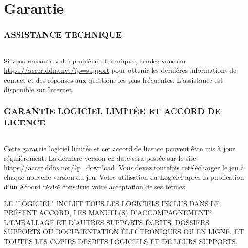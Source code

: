 \documentclass[titlepage, 13px, a4paper]{report}
\begin{document}
\AddToShipoutPicture*{\BackgroundPic}

\maketitle
\tableofcontents


\part{Garantie} 

\section*{ASSISTANCE TECHNIQUE}
\paragraph*{} \hspace{0pt}
Si vous rencontrez des problèmes techniques, rendez-vous sur 
\url{https://accer.ddns.net/?p=support} pour obtenir les dernières informations de 
contact et des réponses aux questions les plus fréquentes. L'assistance est
disponible sur Internet. \\

\section*{GARANTIE LOGICIEL LIMITÉE ET ACCORD DE LICENCE}
\paragraph*{} \hspace{0pt}
Cette garantie logiciel limitée et cet accord de licence peuvent être mis à
jour régulièrement. La dernière version en date sera postée sur le site 
\url{https://accer.ddns.net/?p=download}. Vous devez toutefois retélécharger le 
jeu à chaque nouvelle version du jeu. Votre utilisation du Logiciel après la
publication d'un Acoord révisé constitue votre acceptation de ses termes. 

LE "LOGICIEL" INCLUT TOUS LES LOGICIELS INCLUS DANS LE PRÉSENT ACCORD, LES 
MANUEL(S) D'ACCOMPAGNEMENT? L'EMBALLAGE ET D'AUTRES SUPPORTS ÉCRITS, DOSSIERS,
SUPPORTS OU DOCUMENTATION ÉLECTRONIQUES OU EN LIGNE, ET TOUTES LES COPIES
DESDITS LOGICIELS ET DE LEURS SUPPORTS. \\
\end{document}
